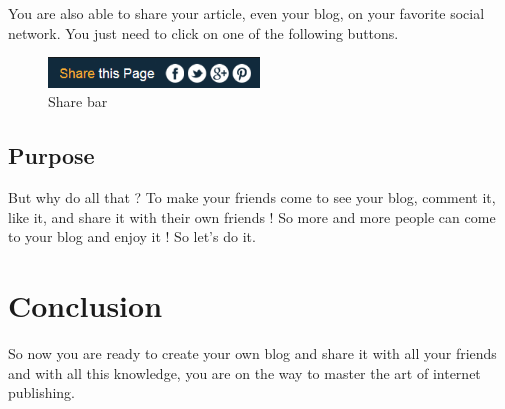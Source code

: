 \documentclass[a4paper,10pt]{article}
\begin{document}
You are also able to share your article, even your blog, on your favorite social network. You just need to click on one of the following buttons.

\begin{figure}[h]
    \center
  \includegraphics[width=0.5\textwidth]{Images/blogBar.png}
    \caption{Share bar}
\end{figure}

\subsection{Purpose}

But why do all that ? To make your friends come to see your blog, comment it, like it, and share it with their own friends ! So more and more people can come to your blog and enjoy it ! So let's do it. 

\newpage
\section{Conclusion}

So now you are ready to create your own blog and share it with all your friends and with all this knowledge, you are on the way to master the art of internet publishing. 
\end{document}

